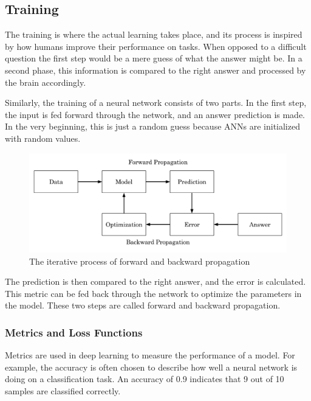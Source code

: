 \subsection{Training}

The training is where the actual learning takes place, and its process is inspired by how humans improve their performance on tasks. When opposed to a difficult question the first step would be a mere guess of what the answer might be. In a second phase, this information is compared to the right answer and processed by the brain accordingly.

Similarly, the training of a neural network consists of two parts. In the first step, the input is fed forward through the network, and an answer prediction is made. In the very beginning, this is just a random guess because ANNs are initialized with random values. 

\begin{figure}[H]
\centering
\par
\includegraphics[width=1.0\textwidth]{imgs/forward_backward_prop.png}
\caption{The iterative process of forward and backward propagation}
\par
\end{figure}

The prediction is then compared to the right answer, and the error is calculated. This metric can be fed back through the network to optimize the parameters in the model. These two steps are called forward and backward propagation.

\subsubsection{Metrics and Loss Functions}

Metrics are used in deep learning to measure the performance of a model. For example, the accuracy is often chosen to describe how well a neural network is doing on a classification task. An accuracy of 0.9 indicates that 9 out of 10 samples are classified correctly.

